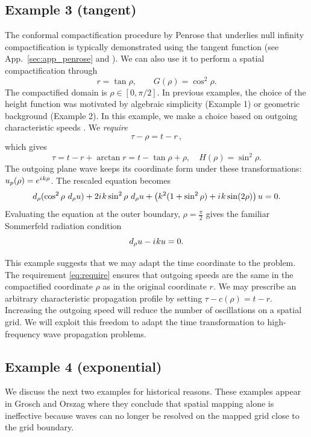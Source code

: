 \documentclass[draft,onefignum,onetabnum]{siamart190516}
\newcommand{\be}{\begin{equation}}
\newcommand{\ee}{\end{equation}}
\newcommand{\iu}{{i\mkern1mu}}
\begin{document}
\subsection{Example 3 (tangent)}
The conformal compactification procedure by Penrose \cite{Penrose, Penrose65} that underlies null infinity compactification is typically demonstrated using the tangent function (see App.~\ref{sec:app_penrose} and \cite{penrose2011republication}). We can also use it to perform a spatial compactification through
\be\label{eq:ex3_mapping} r = \tan \rho, \qquad G(\rho) = \cos^2\rho. \ee
The compactified domain is $\rho\in[0,\pi/2]$. In previous examples, the choice of the height function was motivated by algebraic simplicity (Example 1) or geometric background (Example 2). In this example, we make a choice based on outgoing characteristic speeds \cite{ZENGINOGLU20112286, bernuzzi2011binary}. We \emph{require} 
\be\label{eq:require} \tau - \rho = t - r\,,\ee
which gives
\[ \tau = t - r + \arctan r = t - \tan \rho + \rho, \quad H(\rho) = \sin^2\rho. \]
The outgoing plane wave keeps its coordinate form under these transformations: $u_p(\rho) = e^{\iu k \rho}$. The rescaled equation becomes
\be\label{eq:transformed} d_\rho(\cos^2 \rho \ d_\rho u ) + 2\iu k \sin^2\rho \ d_\rho u + \left(k^2 (1+\sin^2\rho)+\iu k \sin(2\rho) \right) u = 0. \ee
Evaluating the equation at the outer boundary, $\rho=\frac{\pi}{2}$ gives the familiar Sommerfeld radiation condition
\[ d_\rho u - \iu k u = 0. \]

This example suggests that we may adapt the time coordinate to the problem. The requirement \eqref{eq:require} ensures that outgoing speeds are the same in the compactified coordinate $\rho$ as in the original coordinate $r$. We may prescribe an arbitrary characteristic propagation profile by setting $\tau - c(\rho) = t - r$. Increasing the outgoing speed will reduce the number of oscillations on a spatial grid. We will exploit this freedom to adapt the time transformation to high-frequency wave propagation problems.

\subsection{Example 4 (exponential)}
We discuss the next two examples for historical reasons. These examples appear in Grosch and Orszag \cite{GroschOrszag77} where they conclude that spatial mapping alone is ineffective because waves can no longer be resolved on the mapped grid close to the grid boundary. 
\end{document}
